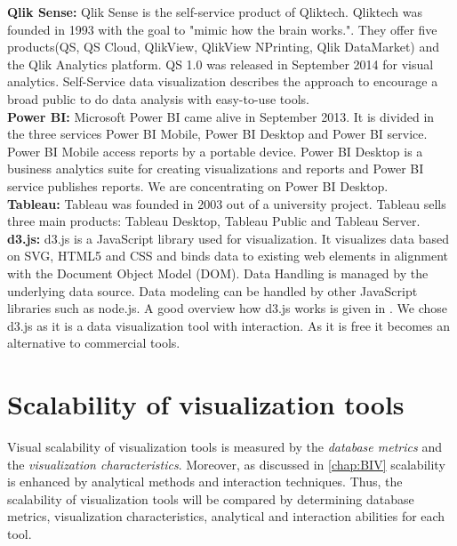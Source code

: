 \textbf{Qlik Sense: }
Qlik Sense is the self-service product of Qliktech. Qliktech was founded in 1993 with the goal to "mimic how the brain works."\cite{qlikHistory}. They offer five products(QS, QS Cloud, QlikView, QlikView NPrinting, Qlik DataMarket) and the Qlik Analytics platform. QS 1.0 was released in September 2014 for visual analytics. 
Self-Service data visualization describes the approach to encourage a broad public to do data analysis with easy-to-use tools.\\
\textbf{Power BI: }
Microsoft Power BI came alive in September 2013. It is divided in the three services Power BI Mobile, Power BI Desktop and Power BI service. Power BI Mobile access reports by a portable device. Power BI Desktop is a business analytics suite for creating visualizations and reports and Power BI service publishes reports. We are concentrating on Power BI Desktop.\\
\textbf{Tableau: }
Tableau was founded in 2003 out of a university project. Tableau sells three main products: Tableau Desktop, Tableau Public and Tableau Server.\\ 
\textbf{d3.js: }
d3.js is a JavaScript library used for visualization. It visualizes data based on SVG, HTML5 and CSS and binds data to existing web elements in alignment with the Document Object Model (DOM).  Data Handling is managed by the underlying data source. Data modeling can be handled by other JavaScript libraries such as node.js. A good overview how d3.js works is given in \cite{Meeks}. 
We chose d3.js as it is a data visualization tool with interaction. As it is free it becomes an alternative to commercial tools.\\


\section{Scalability of visualization tools}\label{tool:scalability}
Visual scalability of visualization tools is measured by the \textit{database metrics} and the \textit{visualization characteristics}. Moreover, as discussed in \ref{chap:BIV} scalability is enhanced by analytical methods and interaction techniques. Thus, the scalability of visualization tools will be compared by determining database metrics, visualization characteristics, analytical and interaction abilities for each tool.

